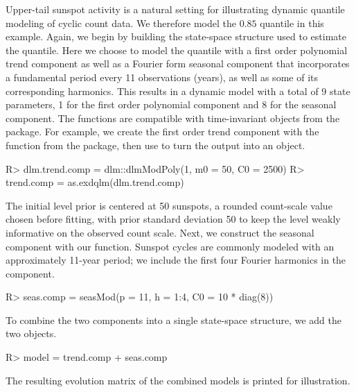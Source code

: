 \documentclass{jss}
\begin{document}
Upper-tail sunspot activity is a natural setting for illustrating dynamic quantile modeling of cyclic count data. We therefore model the \(0.85\) quantile in this example. Again, we begin by building the state-space structure used to estimate the quantile. Here we choose to model the quantile with a first order polynomial trend component as well as a Fourier form seasonal component that incorporates a fundamental period every 11 observations (years), as well as some of its corresponding harmonics. This results in a dynamic model with a total of 9 state parameters, 1 for the first order polynomial component and 8 for the seasonal component. The  functions are compatible with time-invariant  objects from the  package. For example, we create the first order trend component with the function  from the  package, then use  to turn the output into an  object.
\begin{CodeChunk}
\begin{CodeInput}
R> dlm.trend.comp = dlm::dlmModPoly(1, m0 = 50, C0 = 2500)
R> trend.comp = as.exdqlm(dlm.trend.comp)
\end{CodeInput}
\end{CodeChunk}
The initial level prior is centered at 50 sunspots, a rounded count-scale value chosen before fitting, with prior standard deviation 50 to keep the level weakly informative on the observed count scale. Next, we construct the seasonal component with our  function. Sunspot cycles are commonly modeled with an approximately 11-year period; we include the first four Fourier harmonics in the component.
\begin{CodeChunk}
\begin{CodeInput}
R> seas.comp = seasMod(p = 11, h = 1:4, C0 = 10 * diag(8))
\end{CodeInput}
\end{CodeChunk}
To combine the two components into a single state-space structure, we add the two  objects.
\begin{CodeChunk}
\begin{CodeInput}
R> model = trend.comp + seas.comp
\end{CodeInput}
\end{CodeChunk}
The resulting evolution matrix of the combined models is printed for illustration.
\end{document}
